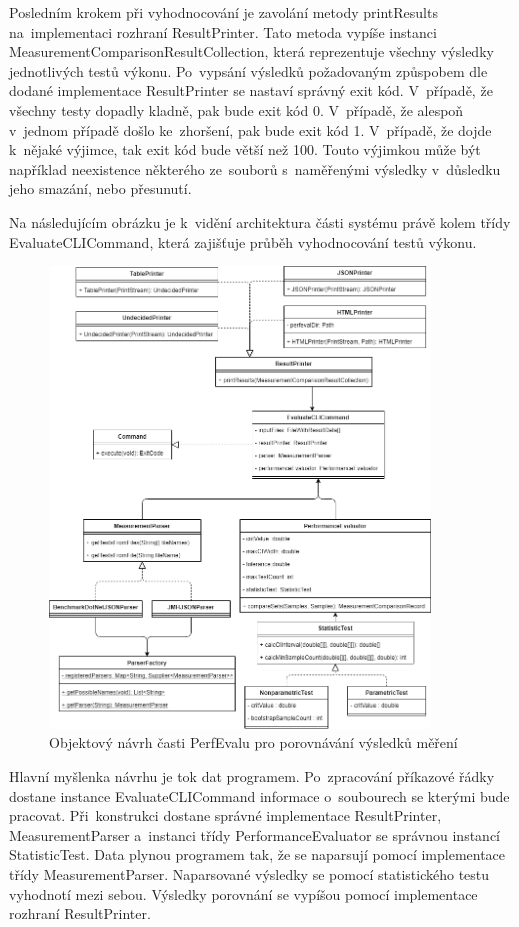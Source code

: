 Posledním krokem při vyhodnocování je zavolání metody printResults na~implementaci rozhraní ResultPrinter. Tato metoda
vypíše instanci MeasurementComparisonResultCollection, která reprezentuje všechny výsledky jednotlivých testů výkonu.
Po~vypsání výsledků požadovaným způspobem dle dodané implementace ResultPrinter se nastaví správný exit kód. V~případě,
že všechny testy dopadly kladně, pak bude exit kód 0. V~případě, že alespoň v~jednom případě došlo ke~zhoršení, pak bude
exit kód 1. V~případě, že dojde k~nějaké výjimce, tak exit kód bude větší než 100. Touto výjimkou může být například
neexistence některého ze~souborů s~naměřenými výsledky v~důsledku jeho smazání, nebo přesunutí.

Na následujícím obrázku je k~vidění architektura části systému právě kolem třídy EvaluateCLICommand, která zajišťuje
průběh vyhodnocování testů výkonu.

    \begin{figure}[h!]
        \centering
        \includegraphics[width=0.9\textwidth]{../img/perfeval_evaluate.png}
        \caption{Objektový návrh časti PerfEvalu pro porovnávání výsledků měření}
    \end{figure}

Hlavní myšlenka návrhu je tok dat programem. Po~zpracování příkazové řádky dostane instance EvaluateCLICommand informace
o~soubourech se kterými bude pracovat. Při~konstrukci dostane správné implementace ResultPrinter,
MeasurementParser a~instanci třídy PerformanceEvaluator se správnou instancí StatisticTest.
Data plynou programem tak, že se naparsují pomocí implementace třídy MeasurementParser. Naparsované výsledky
se pomocí statistického testu vyhodnotí mezi sebou. Výsledky porovnání se vypíšou pomocí implementace rozhraní
ResultPrinter.

